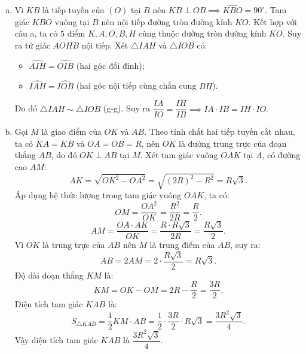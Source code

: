 \begin{bt}
{\begin{enumerate}[a)]
	Suy ra bốn điểm $K, A, O, H$ cùng thuộc đường tròn đường kính $KO$, do đó tứ giác $KAOH$ nội tiếp.
	\item Vì $KB$ là tiếp tuyến của $(O)$ tại $B$ nên $KB \perp OB \implies \widehat{KBO} = 90^\circ$.
	Tam giác $KBO$ vuông tại $B$ nên nội tiếp đường tròn đường kính $KO$.
	Kết hợp với câu a, ta có $5$ điểm $K, A, O, B, H$ cùng thuộc đường tròn đường kính $KO$.
	Suy ra tứ giác $AOHB$ nội tiếp.
	Xét $\triangle IAH$ và $\triangle IOB$ có:
	\begin{itemize}
		\item $\widehat{AIH} = \widehat{OIB}$ (hai góc đối đỉnh);
		\item $\widehat{IAH} = \widehat{IOB}$ (hai góc nội tiếp cùng chắn cung $BH$).
	\end{itemize}
	Do đó $\triangle IAH \sim \triangle IOB$ (g-g).
	Suy ra $\dfrac{IA}{IO} = \dfrac{IH}{IB} \implies IA \cdot IB = IH \cdot IO$.
	\item Gọi $M$ là giao điểm của $OK$ và $AB$.
	Theo tính chất hai tiếp tuyến cắt nhau, ta có $KA = KB$ và $OA = OB = R$, nên $OK$ là đường trung trực của đoạn thẳng $AB$, do đó $OK \perp AB$ tại $M$.
	Xét tam giác vuông $OAK$ tại $A$, có đường cao $AM$:
	$$AK = \sqrt{OK^2 - OA^2} = \sqrt{(2R)^2 - R^2} = R\sqrt{3}.$$
	Áp dụng hệ thức lượng trong tam giác vuông $OAK$, ta có:
	$$OM = \dfrac{OA^2}{OK} = \dfrac{R^2}{2R} = \dfrac{R}{2}.$$
	$$AM = \dfrac{OA \cdot AK}{OK} = \dfrac{R \cdot R\sqrt{3}}{2R} = \dfrac{R\sqrt{3}}{2}.$$
	Vì $OK$ là trung trực của $AB$ nên $M$ là trung điểm của $AB$, suy ra:
	$$AB = 2AM = 2 \cdot \dfrac{R\sqrt{3}}{2} = R\sqrt{3}.$$
	Độ dài đoạn thẳng $KM$ là:
	$$KM = OK - OM = 2R - \dfrac{R}{2} = \dfrac{3R}{2}.$$
	Diện tích tam giác $KAB$ là:
	$$S_{\triangle KAB} = \dfrac{1}{2} KM \cdot AB = \dfrac{1}{2} \cdot \dfrac{3R}{2} \cdot R\sqrt{3} = \dfrac{3R^2\sqrt{3}}{4}.$$
	Vậy diện tích tam giác $KAB$ là $\dfrac{3R^2\sqrt{3}}{4}$.
\end{enumerate}
}
\end{bt}

